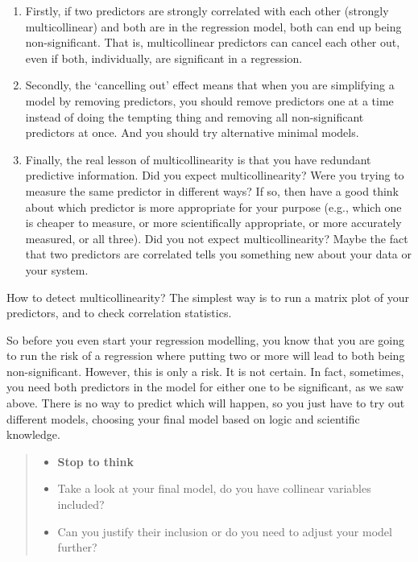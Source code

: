 \documentclass[
]{book}
\providecommand{\tightlist}{%
  \setlength{\itemsep}{0pt}\setlength{\parskip}{0pt}}
\begin{document}
\begin{enumerate}
\def\labelenumi{\arabic{enumi})}
\tightlist
\item
  Firstly, if two predictors are strongly correlated with each other (strongly multicollinear) and both are in the regression model, both can end up being non-significant. That is, multicollinear predictors can cancel each other out, even if both, individually, are significant in a regression.\\
\item
  Secondly, the `cancelling out' effect means that when you are simplifying a model by removing predictors, you should remove predictors one at a time instead of doing the tempting thing and removing all non-significant predictors at once. And you should try alternative minimal models.\\
\item
  Finally, the real lesson of multicollinearity is that you have redundant predictive information. Did you expect multicollinearity? Were you trying to measure the same predictor in different ways? If so, then have a good think about which predictor is more appropriate for your purpose (e.g., which one is cheaper to measure, or more scientifically appropriate, or more accurately measured, or all three). Did you not expect multicollinearity? Maybe the fact that two predictors are correlated tells you something new about your data or your system.
\end{enumerate}

How to detect multicollinearity? The simplest way is to run a matrix plot of your predictors, and to check correlation statistics.

So before you even start your regression modelling, you know that you are going to run the risk of a regression where putting two or more will lead to both being non-significant. However, this is only a risk. It is not certain. In fact, sometimes, you need both predictors in the model for either one to be significant, as we saw above. There is no way to predict which will happen, so you just have to try out different models, choosing your final model based on logic and scientific knowledge.

\begin{quote}
\begin{itemize}
\tightlist
\item
  \textbf{Stop to think}
\item
  Take a look at your final model, do you have collinear variables included?
\item
  Can you justify their inclusion or do you need to adjust your model further?
\end{itemize}
\end{quote}
\end{document}
